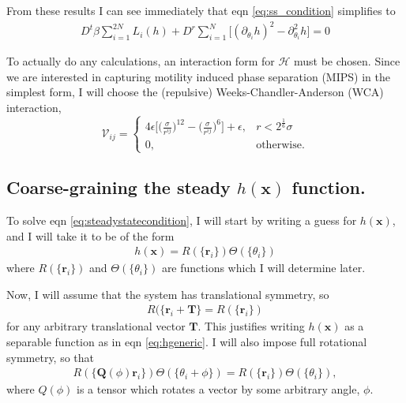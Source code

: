 \documentclass{article}
\begin{document}
From these results I can see immediately that eqn \ref{eq:ss_condition} simplifies to
\begin{align}\label{eq:steadystatecondition}
  D^t\beta\sum_{i=1}^{2N}L_i(h)+D^r\sum_{i=1}^{N}\big[(\partial_{\theta_i}h)^2
  -\partial_{\theta_i}^2h\big]=0
\end{align}

To actually do any calculations, an interaction form for $\mathcal{H}$ must be chosen. Since we
are interested in capturing motility induced phase separation (MIPS) in the simplest form, I
will choose the (repulsive) Weeks-Chandler-Anderson (WCA) interaction,
\begin{equation}
  \mathcal{V}_{ij} =
  \begin{cases}
    4\epsilon\bigg[\bigg(\frac{\sigma}{r^{ij}}\bigg)^{12}
    -\bigg(\frac{\sigma}{r^{ij}}\bigg)^6\bigg]+\epsilon, & r<2^{\frac{1}{6}}\sigma \\
    0, & \mathrm{otherwise}.
  \end{cases}
\end{equation}


\subsection{Coarse-graining the steady $h(\bm{x})$ function.}

To solve eqn \ref{eq:steadystatecondition}, I will start by writing a guess for $h(\bm{x})$, and I
will take it to be of the form
\begin{align}\label{eq:hgeneric}
  h(\bm{x})=R(\{\bm{r}_i\})\Theta(\{\theta_i\})
\end{align}
where $R(\{\bm{r}_i\})$ and $\Theta(\{\theta_i\})$ are functions which I will determine later.

Now, I will assume that the system has translational symmetry, so
\begin{align}\label{eq:Rtranssym}
  R(\{\bm{r}_i+\bm{T}\}=R(\{\bm{r}_i\})
\end{align}
for any arbitrary translational vector $\bm{T}$. This justifies writing $h(\bm{x})$ as a separable
function as in eqn \ref{eq:hgeneric}. I will also impose full rotational symmetry, so that
\begin{align}\label{eq:hrotsymm}
  R(\{\bm{Q}(\phi)\bm{r}_i\})\Theta(\{\theta_i+\phi\})=R(\{\bm{r}_i\})\Theta(\{\theta_i\}),
\end{align}
where $Q(\phi)$ is a tensor which rotates a vector by some arbitrary angle, $\phi$.
\end{document}
